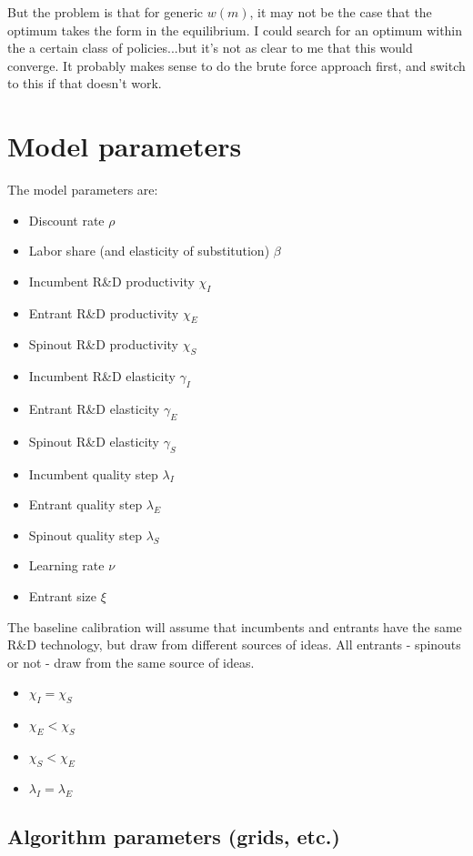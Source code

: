 \documentclass[12pt,english]{article}
\theoremstyle{remark}
\begin{document}
But the problem is that for generic $w(m)$, it may not be the case that the optimum takes the form in the equilibrium. I could search for an optimum within the a certain class of policies...but it's not as clear to me that this would converge. It probably makes sense to do the brute force approach first, and switch to this if that doesn't work.

\section{Model parameters}

The model parameters are:
\begin{itemize}
	\item Discount rate $\rho$
	\item Labor share (and elasticity of substitution) $\beta$
	\item Incumbent R\&D productivity $\chi_I$
	\item Entrant R\&D productivity $\chi_E$
	\item Spinout R\&D productivity $\chi_S$
	\item Incumbent R\&D elasticity $\gamma_I$
	\item Entrant R\&D elasticity $\gamma_E$
	\item Spinout R\&D elasticity $\gamma_S$
	\item Incumbent quality step $\lambda_I$
	\item Entrant quality step $\lambda_E$
	\item Spinout quality step $\lambda_S$
	\item Learning rate $\nu$
	\item Entrant size $\xi$
\end{itemize}

The baseline calibration will assume that incumbents and entrants have the same R\&D technology, but draw from different sources of ideas. All entrants - spinouts or not - draw from the same source of ideas.
\begin{itemize}
	\item $\chi_I = \chi_S$
	\item $\chi_E < \chi_S$
	\item $\chi_S < \chi_E$
	\item $\lambda_I = \lambda_E$
\end{itemize}

\subsection{Algorithm parameters (grids, etc.)}
\end{document}
